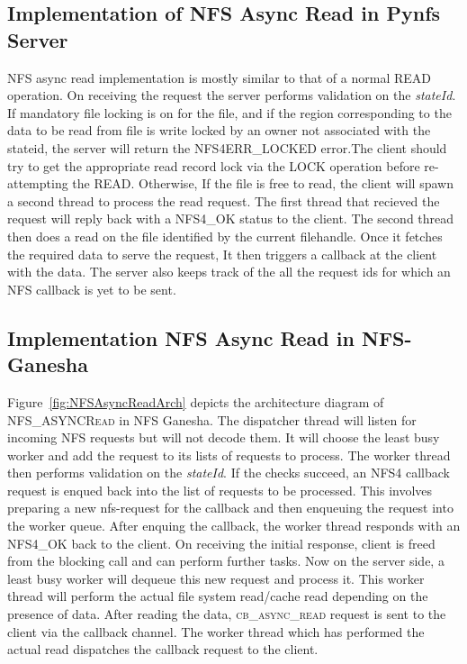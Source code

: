 \subsection{Implementation of NFS Async Read in Pynfs Server}
 NFS async read implementation is mostly similar to that of a normal READ operation. On receiving the request the server performs validation on the \textit{stateId}. If mandatory file locking is on for the file, and if the region corresponding to the data to be read from file is write locked by an owner not associated with the stateid, the server will return the NFS4ERR\_LOCKED error.The client should try to get the appropriate read record lock via the LOCK operation before re-attempting the READ. Otherwise, If the file is free to read, the client will spawn a second thread to process the read request. The first thread that recieved the request will reply back with a NFS4\_OK status to the client. The second thread then does a read on the file identified by the current filehandle. Once it fetches the required data to serve the request, It then triggers a callback at the client with the data. The server also keeps track of the all the request ids for which an NFS callback is yet to be sent.
 
    
\subsection{Implementation NFS Async Read in NFS-Ganesha}  

 Figure~\ref{fig:NFSAsyncReadArch} depicts the architecture diagram of \textsc{NFS\_ASYNCRead} in NFS Ganesha. The dispatcher thread will listen for incoming NFS requests but will not decode them. It will choose the least busy worker and add the request to its lists of requests to process. The worker thread then performs validation on the \textit{stateId}. If  the checks succeed, an NFS4 callback request is enqued back into the list of requests to be processed.  This involves preparing a new nfs-request for the callback and then enqueuing the request into the worker queue. After enquing the callback, the worker thread responds with an \textsc{NFS4\_OK} back to the client. On receiving the initial response, client is freed from the blocking call and can perform further tasks. Now on the server side, a least busy worker will dequeue this new request and process it. This worker thread will perform the actual file system read/cache read depending on the presence of data. After reading the data, \textsc{cb\_async\_read} request is sent to the client via the callback channel. The worker thread which has performed the actual read dispatches the callback request to the client. 
 
 






 
 
 








